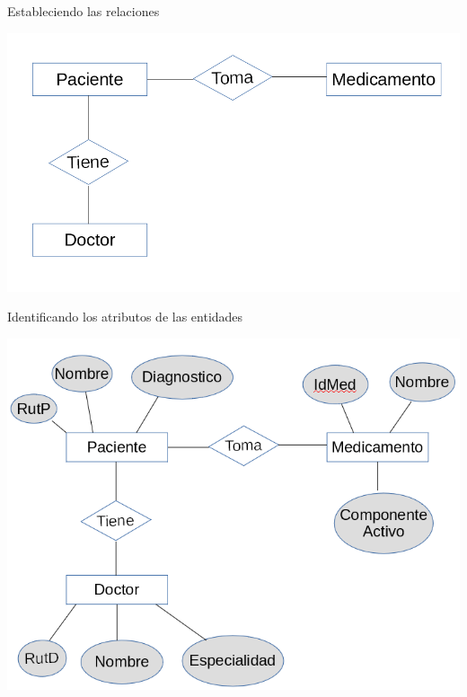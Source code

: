\documentclass[11pt]{beamer}
\begin{document}
\begin{frame}{Estableciendo las relaciones}

\begin{center}
\includegraphics[scale=.5]{images/2} 
\end{center}

\end{frame}



\begin{frame}{Identificando los atributos de las entidades}

\begin{center}
\includegraphics[scale=.5]{images/3} 
\end{center}

\end{frame}
\end{document}
